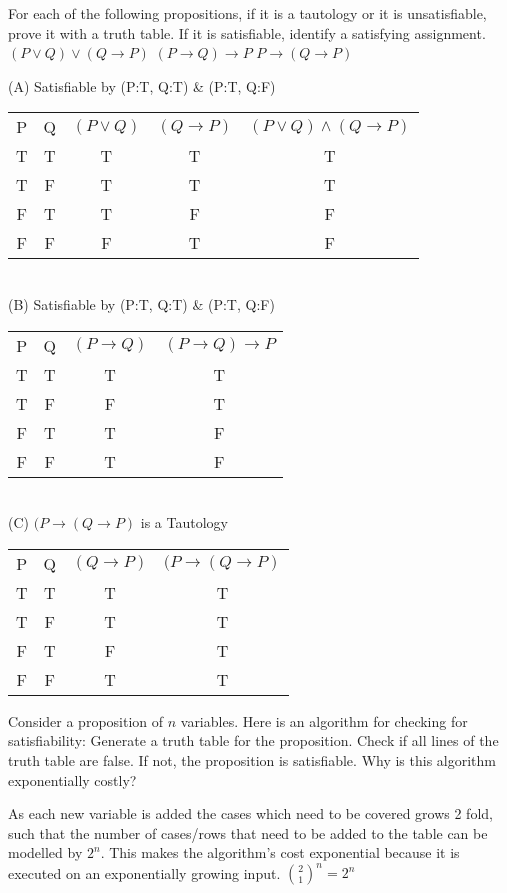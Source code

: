 \documentclass[solution,letterpaper]{cs20}
\begin{document}
\begin{problem}
For each of the following propositions, if it is a tautology or it is unsatisfiable, prove it with a truth table. If it is satisfiable, identify a satisfying assignment. 
\subproblem $(P \vee Q) \vee (Q \to P)$ 
\subproblem $(P \to Q) \to P$
\subproblem $P \to (Q \to P)$

\begin{solution}
(A) Satisfiable by (P:T, Q:T) \& (P:T, Q:F) \\
\begin{tabular}{c|c|c|c|c|}
    P & Q & $(P \lor Q)$ & $(Q \to P)$ & $(P \lor Q) \land (Q \to P)$\\
    T & T & T & T & T\\
    T & F & T & T & T\\
    F & T & T & F & F\\
    F & F & F & T & F\\
\end{tabular}
\label{tab:my_label} \\

(B) Satisfiable by (P:T, Q:T) \& (P:T, Q:F) \\
\begin{tabular}{c|c|c|c|}
    P & Q & $(P \to Q)$ & $(P \to Q) \to P$ \\
    T & T & T & T \\
    T & F & F & T \\
    F & T & T & F \\ 
    F & F & T & F \\
\end{tabular} \\

(C) $(P \to (Q \to P)$ is a Tautology \\
\begin{tabular}{c|c|c|c}
     P & Q & $(Q \to P)$ & $(P \to (Q \to P)$ \\
     T & T & T & T \\
     T & F & T & T \\
     F & T & F & T \\
     F & F & T & T \\
\end{tabular}
\end{solution}
\end{problem}
\pagebreak

\begin{problem}
    Consider a proposition of $n$ variables. Here is an algorithm for checking for satisfiability: Generate a truth table for the proposition. Check if all lines of the truth table are false. If not, the proposition is satisfiable. Why is this algorithm exponentially costly?
    \begin{solution}
        As each new variable is added the cases which need to be covered grows 2 fold, such that the number of cases/rows that need to be added to the table can be modelled by $2^n$. This makes the algorithm's cost exponential because it is executed on an exponentially growing input.
        $\binom{2}{1}^n = 2^n$
    \end{solution}
\end{problem}
\pagebreak
\end{document}

